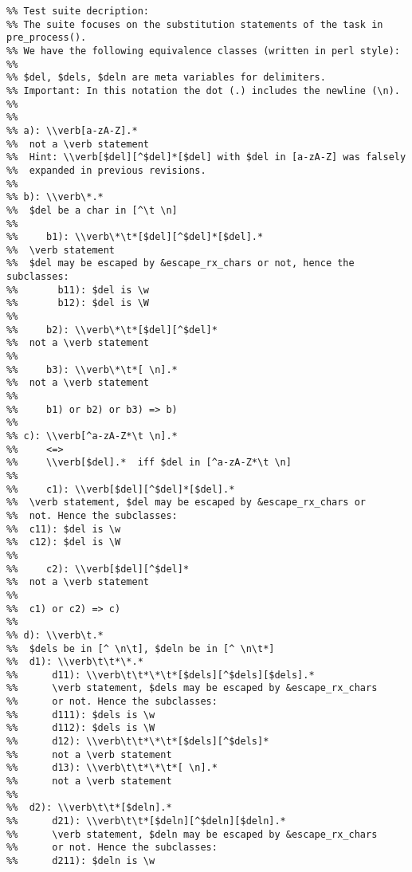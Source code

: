 \begin{verbatim}
%% Test suite decription:
%% The suite focuses on the substitution statements of the task in pre_process().
%% We have the following equivalence classes (written in perl style):
%%
%% $del, $dels, $deln are meta variables for delimiters.
%% Important: In this notation the dot (.) includes the newline (\n).
%%
%%
%% a): \\verb[a-zA-Z].*
%%	not a \verb statement
%%	Hint: \\verb[$del][^$del]*[$del] with $del in [a-zA-Z] was falsely
%%	expanded in previous revisions.
%%
%% b): \\verb\*.*
%%	$del be a char in [^\t \n]
%%
%%     b1): \\verb\*\t*[$del][^$del]*[$del].*
%%	\verb statement
%%	$del may be escaped by &escape_rx_chars or not, hence the subclasses:
%%       b11): $del is \w
%%       b12): $del is \W
%%
%%     b2): \\verb\*\t*[$del][^$del]*
%%	not a \verb statement
%%
%%     b3): \\verb\*\t*[ \n].*
%%	not a \verb statement
%%
%%     b1) or b2) or b3) => b)
%%
%% c): \\verb[^a-zA-Z*\t \n].*
%%     <=>
%%     \\verb[$del].*  iff $del in [^a-zA-Z*\t \n]
%%
%%     c1): \\verb[$del][^$del]*[$del].*
%%	\verb statement, $del may be escaped by &escape_rx_chars or
%%	not. Hence the subclasses:
%%	c11): $del is \w
%%	c12): $del is \W
%%
%%     c2): \\verb[$del][^$del]*
%%	not a \verb statement
%%
%%	c1) or c2) => c)
%%
%% d): \\verb\t.*
%%	$dels be in [^ \n\t], $deln be in [^ \n\t*]
%%	d1): \\verb\t\t*\*.*
%%	    d11): \\verb\t\t*\*\t*[$dels][^$dels][$dels].*
%%	    \verb statement, $dels may be escaped by &escape_rx_chars
%%	    or not. Hence the subclasses:
%%		d111): $dels is \w
%%		d112): $dels is \W
%%	    d12): \\verb\t\t*\*\t*[$dels][^$dels]*
%%	    not a \verb statement
%%	    d13): \\verb\t\t*\*\t*[ \n].*
%%	    not a \verb statement
%%
%%	d2): \\verb\t\t*[$deln].*
%%	    d21): \\verb\t\t*[$deln][^$deln][$deln].*
%%	    \verb statement, $deln may be escaped by &escape_rx_chars
%%	    or not. Hence the subclasses:
%%		d211): $deln is \w

\end{verbatim}
